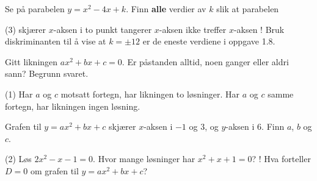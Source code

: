 
Se på parabelen $y = x^2 - 4x + k$. Finn \textbf{alle} verdier av $k$ slik at parabelen
\begin{tasks}(3)
  \task skjærer $x$-aksen i to punkt
  \task tangerer $x$-aksen
  \task ikke treffer $x$-aksen
  \task! Bruk diskriminanten til å vise at $k = \pm 12$ er de eneste verdiene i oppgave 1.8.
\end{tasks}

Gitt likningen $ax^2 + bx + c = 0$. Er påstanden alltid, noen ganger eller aldri sann? Begrunn svaret.
\begin{tasks}(1)
  \task Har $a$ og $c$ motsatt fortegn, har likningen to løsninger.
  \task Har $a$ og $c$ samme fortegn, har likningen ingen løsning.
\end{tasks}

Grafen til $y = ax^2 + bx + c$ skjærer $x$-aksen i $-1$ og $3$, og $y$-aksen i $6$. Finn $a$, $b$ og $c$.

\begin{sjekk}
\begin{tasks}(2)
  \task Løs $2x^2 - x - 1 = 0$.
  \task Hvor mange løsninger har $x^2 + x + 1 = 0$?
  \task! Hva forteller $D = 0$ om grafen til $y = ax^2 + bx + c$?
\end{tasks}
\end{sjekk}
